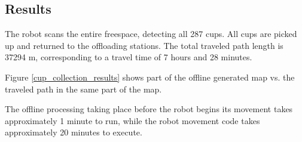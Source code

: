 \subsection{Results}
The robot scans the entire freespace, detecting all 287 cups.
All cups are picked up and returned to the offloading stations.
The total traveled path length is 37294 m, corresponding to a travel time of 7 hours and 28 minutes.

Figure \ref{cup_collection_results} shows part of the offline generated map vs. the traveled path in the same part of the map.

The offline processing taking place before the robot begins its movement takes approximately 1 minute
to run, while the robot movement code takes approximately 20 minutes to execute. 

